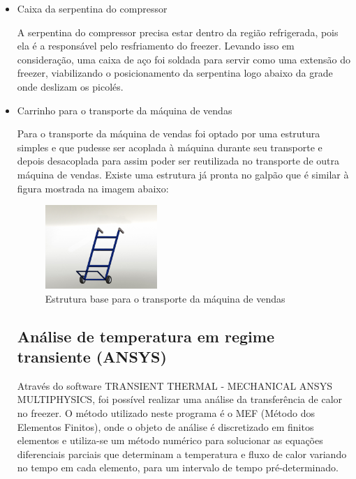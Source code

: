 \begin{itemize}
\item Caixa da serpentina do compressor

A serpentina do compressor precisa estar dentro da região refrigerada, pois ela é a responsável pelo resfriamento do freezer. Levando isso em consideração, uma caixa de aço foi soldada para servir como uma extensão do freezer, viabilizando o posicionamento da serpentina logo abaixo da grade onde deslizam os picolés. 


\item Carrinho para o transporte da máquina de vendas

	Para o transporte da máquina de vendas foi optado por uma estrutura simples e que pudesse ser acoplada à máquina durante seu transporte e depois desacoplada para assim poder ser reutilizada no transporte de outra máquina de vendas. Existe uma  estrutura já pronta no galpão que é similar à figura mostrada na imagem abaixo:
    
   \begin{figure}[H]
	\centering
    \includegraphics[width=0.4\textwidth]{figuras/Render_-_Carro_de_Transporte}
    \caption{Estrutura base para o transporte da máquina de vendas}
    \label{fig:Render_-_Carro_de_Transporte}
\end{figure}
\subsection{Análise de temperatura em regime transiente (ANSYS)}

 Através do software TRANSIENT THERMAL - MECHANICAL ANSYS MULTIPHYSICS, foi possível realizar uma análise da transferência de calor no freezer. O método utilizado neste programa é o MEF (Método dos Elementos Finitos), onde o objeto de análise é discretizado em finitos elementos e utiliza-se um método numérico para solucionar as equações diferenciais parciais que determinam a temperatura e fluxo de calor variando no tempo em cada elemento, para um intervalo de tempo pré-determinado.


\end{itemize} 

